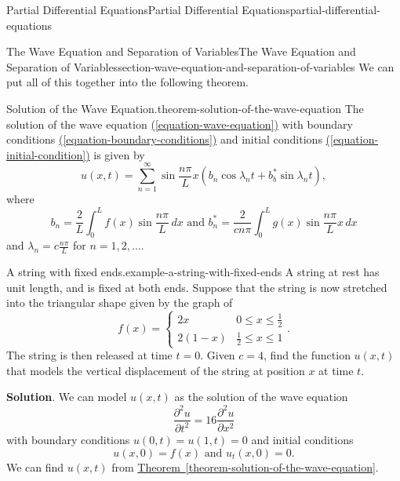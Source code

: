 \documentclass[oneside,10pt,]{book}
\numberwithin{equation}{section}
\newcommand{\pdv}[3][]{\dfrac{\partial^{#1} #2}{\partial #3^{#1}}}
\newcommand{\amp}{&}
\begin{document}
\begin{chapterptx}{Partial Differential Equations}{}{Partial Differential Equations}{}{}{partial-differential-equations}
\begin{sectionptx}{The Wave Equation and Separation of Variables}{}{The Wave Equation and Separation of Variables}{}{}{section-wave-equation-and-separation-of-variables}
\hypertarget{p-664}{}%
We can put all of this together into the following theorem.%
\begin{theorem}{Solution of the Wave Equation.}{}{theorem-solution-of-the-wave-equation}%
\hypertarget{p-665}{}%
The solution of the wave equation \hyperref[equation-wave-equation]{(\ref{equation-wave-equation})} with boundary conditions \hyperref[equation-boundary-conditions]{(\ref{equation-boundary-conditions})} and initial conditions \hyperref[equation-initial-condition]{(\ref{equation-initial-condition})} is given by%
\begin{equation*}
u(x,t) = \sum_{n=1}^{\infty}\sin\frac{n\pi}{L}x(b_{n}\cos\lambda_{n}t+b^{*}_{b}\sin\lambda_{n}t),
\end{equation*}
where%
\begin{equation*}
b_{n} = \frac{2}{L}\int_{0}^{L}f(x)\sin\frac{n\pi}{L}\,dx\text{ and }b^{*}_{n} = \frac{2}{cn\pi}\int_{0}^{L}g(x)\sin\frac{n\pi}{L}x\,dx
\end{equation*}
and \(\lambda_{n} = c\frac{n\pi}{L}\) for \(n=1,2,\ldots\).%
\end{theorem}
\begin{example}{A string with fixed ends.}{example-a-string-with-fixed-ends}%
\hypertarget{p-666}{}%
A string at rest has unit length, and is fixed at both ends. Suppose that the string is now stretched into the triangular shape given by the graph of%
\begin{equation*}
f(x) = \begin{cases} 2x \amp 0\leq x\leq \frac{1}{2} \\ 2(1-x) \amp \frac{1}{2}\leq x\leq 1 \end{cases}.
\end{equation*}
The string is then released at time \(t=0\). Given \(c=4\), find the function \(u(x,t)\) that models the vertical displacement of the string at position \(x\) at time \(t\).%
\par\smallskip%
\noindent\textbf{Solution}.\hypertarget{solution-94}{}\quad%
\hypertarget{p-667}{}%
We can model \(u(x,t)\) as the solution of the wave equation%
\begin{equation*}
\pdv[2]{u}{t} = 16\pdv[2]{u}{x}
\end{equation*}
with boundary conditions \(u(0,t) = u(1,t) = 0\) and initial conditions%
\begin{equation*}
u(x,0) = f(x)\text{ and }u_{t}(x,0) = 0.
\end{equation*}
We can find \(u(x,t)\) from \hyperref[theorem-solution-of-the-wave-equation]{Theorem~\ref{theorem-solution-of-the-wave-equation}}.%

\end{example}
\end{sectionptx}
\end{chapterptx}
\end{document}

